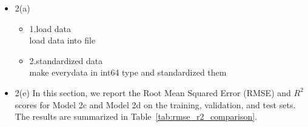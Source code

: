 \documentclass[10pt,letterpaper]{article}
\begin{document}
\begin{itemize}
\begin{itemize}
        \end{itemize}
    \newpage
    \item {2(a)}
        \begin{itemize}
            \item {1.load data}\\
            load data into file
            \item {2.standardized data}\\
            make everydata in int64 type and standardized them
        \end{itemize}
    \newpage
    \item {2(e)}
    In this section, we report the Root Mean Squared Error (RMSE) and \(R^2\) scores for Model 2c and Model 2d on the training, validation, and test sets. The results are summarized in Table~\ref{tab:rmse_r2_comparison}.


\end{itemize}
\end{document}
